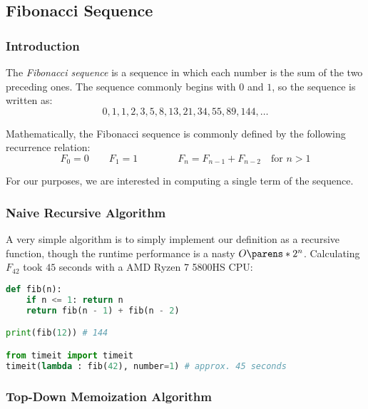 \subsection{Fibonacci Sequence}%
\label{sub:fibonacci-sequence}


\subsubsection{Introduction}%

The \emph{Fibonacci sequence} is a sequence in which each number is the sum of the two preceding ones. The sequence commonly begins with $0$ and $1$, so the sequence is written as:
\begin{equation*}
    0, 1, 1, 2, 3, 5, 8, 13, 21, 34, 55, 89, 144, \dots
\end{equation*}

Mathematically, the Fibonacci sequence is commonly defined by the following recurrence relation:
\begin{equation*}
    F_0 = 0
    \qquad
    F_1 = 1
    \qquad\qquad
    F_n = F_{n - 1} + F_{n - 2}
    \quad \text{for } n > 1
\end{equation*}

For our purposes, we are interested in computing a single term of the sequence.


\subsubsection{Naive Recursive Algorithm}

A very simple algorithm is to simply implement our definition as a recursive function, though the runtime performance is a nasty $O \parens*{2^n}$. Calculating $F_{42}$ took $45$ seconds with a AMD Ryzen 7 5800HS CPU:
\begin{lstlisting}[language={python}, caption={Python code for a naive recursion algorithm. Time: $O \parens*{2^n}$.}]
def fib(n):
    if n <= 1: return n
    return fib(n - 1) + fib(n - 2)

print(fib(12)) # 144

from timeit import timeit
timeit(lambda : fib(42), number=1) # approx. 45 seconds
\end{lstlisting}


\subsubsection{Top-Down Memoization Algorithm}

